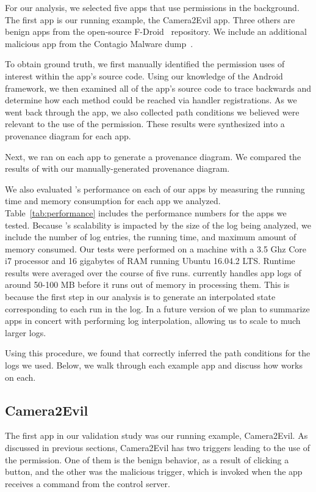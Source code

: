For our analysis, we selected five apps that use permissions in the 
background. The first app is our running
example, the Camera2Evil app. Three others are benign apps from the
open-source F-Droid~\cite{fdroid} repository. We include an additional 
malicious app from the Contagio Malware dump~\cite{contagio}.

To obtain ground truth, we first manually identified the permission uses of interest
within the app's source code. Using our knowledge of the Android
framework, we then examined all of the app's source code to trace
backwards and determine how each method could be reached via handler
registrations. As we went back through the app, we also collected path
conditions we believed were relevant to the use of the permission. 
These results were synthesized into a provenance diagram for each app.

Next, we ran \hogarth{} on each app to generate a provenance
diagram. We compared the results of \hogarth{} with our
manually-generated provenance diagram.

We also evaluated \hogarth{}'s performance on each of our apps by
measuring the running time and memory consumption for each app we
analyzed. Table~\ref{tab:performance} includes the performance numbers
for the apps we tested. Because \hogarth{}'s scalability is impacted
by the size of the log being analyzed, we include the number
of log entries, the running time, and maximum amount of memory
consumed. Our tests were performed on a machine with a 3.5 Ghz Core i7
processor and 16 gigabytes of RAM running Ubuntu 16.04.2 LTS. Runtime
results were averaged over the course of five runs. \hogarth{}
currently handles app logs of around 50-100 MB before it runs out of
memory in processing them. This is because the first step in our
analysis is to generate an interpolated state corresponding to each
run in the log. In a future version of \hogarth{} we plan to summarize
apps in concert with performing log interpolation, allowing us to
scale to much larger logs.

Using this procedure, we found that \hogarth{}
correctly inferred the path conditions for the logs we used. 
Below, we walk through each example app and discuss how \hogarth{} works on
each.


\subsection{Camera2Evil}
%
%
The first app in our validation study was our running example,
Camera2Evil. As discussed in previous sections, Camera2Evil has two
triggers leading to the use of the  permission.  One of
them is the benign behavior, as a result of clicking a button, and the
other was the malicious trigger, which is invoked when the app
receives a command from the control server.

